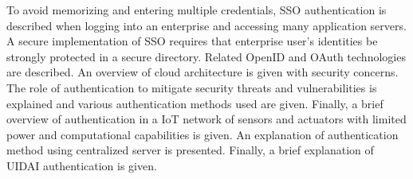 \begin{multicols}{2}
To avoid memorizing and entering multiple credentials, SSO authentication is described when logging into an enterprise and accessing many application servers. A secure implementation of SSO requires that enterprise user's identities be strongly protected in a secure directory. Related OpenID and OAuth technologies are described. An overview of cloud architecture is given with security concerns. The role of authentication to mitigate security threats and vulnerabilities is explained and various authentication methods used are given. Finally, a brief overview of authentication in a IoT network of sensors and actuators with limited power and computational capabilities is given. An explanation of authentication method using centralized server is presented. Finally, a brief explanation of UIDAI authentication is given.


\end{multicols}
